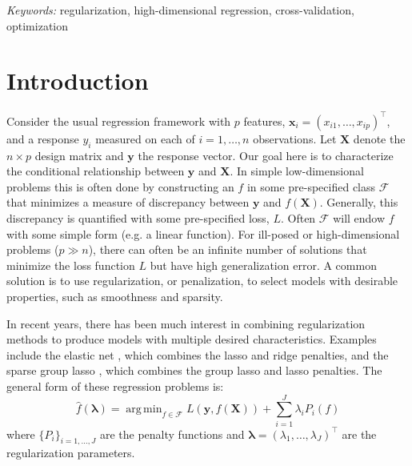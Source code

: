 \documentclass[12pt,letterpaper]{article}
\DeclareMathOperator*{\argmin}{arg\,min}
\begin{document}
\noindent%
{\it Keywords:}  regularization, high-dimensional regression, cross-validation, optimization
\vfill

\newpage
{} %
\section{Introduction}
\label{sec:intro}


Consider the usual regression framework with $p$ features, $\boldsymbol x_i = (x_{i1},\ldots,x_{ip})^\top$, and a response $y_i$ measured on each of $i=1,\ldots,n$ observations. Let $\boldsymbol X$ denote the $n \times p$ design matrix and $\boldsymbol y$ the response vector. Our goal here is to characterize the conditional relationship between $\boldsymbol y$ and $\boldsymbol X$. In simple low-dimensional problems this is often done by constructing an $f$ in some pre-specified class $\mathcal{F}$ that minimizes a measure of discrepancy between $\boldsymbol y$ and $f(\boldsymbol X)$. Generally, this discrepancy is quantified with some pre-specified loss, $L$. Often $\mathcal{F}$ will endow $f$ with some simple form (e.g. a linear function). For ill-posed or high-dimensional problems ($p \gg n$), there can often be an infinite number of solutions that minimize the loss function $L$ but have high generalization error. A common solution is to use regularization, or penalization, to select models with desirable properties, such as smoothness and sparsity.

In recent years, there has been much interest in combining regularization methods to produce models with multiple desired characteristics. Examples include the elastic net \citep{zou2003regression}, which combines the lasso and ridge penalties, and the sparse group lasso \citep{simon2013sparse}, which combines the group lasso and lasso penalties. The general form of these regression problems is:
\begin{equation} \label {eq:basic}
\hat f(\boldsymbol{\lambda}) = \argmin_{f\in\mathcal{F}} L\left (\boldsymbol{y}, f (\boldsymbol{X}) \right ) + \sum\limits_{i=1}^J \lambda_i P_i(f)
\end{equation}
where $\{P_i\}_{i=1, ..., J}$ are the penalty functions and $\boldsymbol{\lambda} = (\lambda_1, \ldots, \lambda_J)^\top$ are the regularization parameters.
\end{document}
